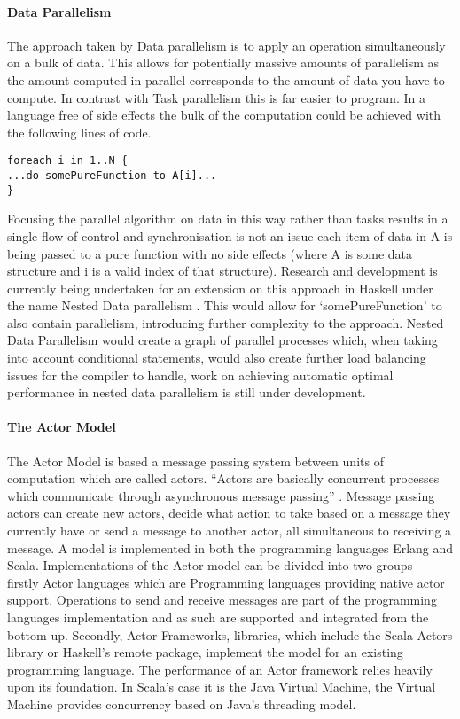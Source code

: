 \documentclass[main.tex]{subfiles}
\begin{document}
{{%
\paragraph{Data Parallelism}The approach taken by Data parallelism is to apply an operation simultaneously on a bulk of data. This allows for potentially massive amounts of parallelism as the amount computed in parallel corresponds to the amount of data you have to compute. In contrast with Task parallelism this is far easier to program. In a language free of side effects the bulk of the computation could be achieved with the following lines of code.

\begin{lstlisting}
foreach i in 1..N {
...do somePureFunction to A[i]...
}
\end{lstlisting}

Focusing the parallel algorithm on data in this way rather than tasks results in a single flow of control and synchronisation is not an issue each item of data in A is being passed to a pure function with no side effects (where A is some data structure and i is a valid index of that structure). Research and development is currently being undertaken for an extension on this approach in Haskell under the name Nested Data parallelism \cite{Jones2008}. This would allow for `somePureFunction' to also contain parallelism, introducing further complexity to the approach. Nested Data Parallelism would create a graph of parallel processes which, when taking into account conditional statements, would also create further load balancing issues for the compiler to handle, work on achieving automatic optimal performance in nested data parallelism is still under development.

\paragraph{The Actor Model}The Actor Model is based a message passing system between units of computation which are called actors. ``Actors are basically concurrent processes which communicate through asynchronous message passing'' \cite{Odersky2006}. Message passing actors can create new actors, decide what action to take based on a message they currently have or send a message to another actor, all simultaneous to receiving a message. A model is implemented in both the programming languages Erlang and Scala. Implementations of the Actor model can be divided into two groups - firstly Actor languages which are Programming languages providing native actor support. Operations to send and receive messages are part of the programming languages implementation and as such are supported and integrated from the bottom-up. Secondly, Actor Frameworks, libraries, which include the Scala Actors library or Haskell's remote package, implement the model for an existing programming language. The performance of an Actor framework relies heavily upon its foundation. In Scala's case it is the Java Virtual Machine, the Virtual Machine provides concurrency based on Java's threading model.

}}
\end{document}
